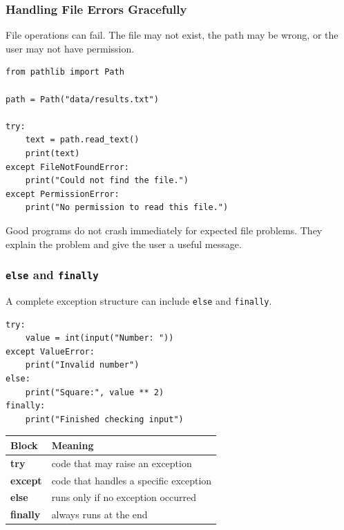 \documentclass[aspectratio=169,10pt]{beamer}
\newcommand{\codeword}[1]{\texttt{#1}}
\begin{document}
\begin{frame}[fragile]
\frametitle{Handling File Errors Gracefully}
\small
File operations can fail. The file may not exist, the path may be wrong, or the user may not have permission.

\vspace{0.15cm}
\begin{lstlisting}[style=pycode]
from pathlib import Path

path = Path("data/results.txt")

try:
    text = path.read_text()
    print(text)
except FileNotFoundError:
    print("Could not find the file.")
except PermissionError:
    print("No permission to read this file.")
\end{lstlisting}

\begin{tcolorbox}[lecturebox,title=Key idea]
Good programs do not crash immediately for expected file problems. They explain the problem and give the user a useful message.
\end{tcolorbox}
\end{frame}

\begin{frame}[fragile]
\frametitle{\texttt{else} and \texttt{finally}}
\small
A complete exception structure can include \codeword{else} and \codeword{finally}.

\vspace{0.15cm}
\begin{lstlisting}[style=pycode]
try:
    value = int(input("Number: "))
except ValueError:
    print("Invalid number")
else:
    print("Square:", value ** 2)
finally:
    print("Finished checking input")
\end{lstlisting}

\begin{center}
\begin{tabularx}{0.92\textwidth}{>{\bfseries\ttfamily}p{1.9cm}X}
\toprule
Block & Meaning \\
\midrule
try & code that may raise an exception \\
except & code that handles a specific exception \\
else & runs only if no exception occurred \\
finally & always runs at the end \\
\bottomrule
\end{tabularx}
\end{center}
\end{frame}
\end{document}
